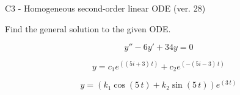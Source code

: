 \begin{exercise}
  \begin{exerciseTitle}C3 - Homogeneous second-order linear ODE (ver. 28)\end{exerciseTitle}
  \begin{exerciseStatement}
    
Find the general solution to the given ODE.

    
\[y''-6y'+34y = 0\]

  \end{exerciseStatement}
  \begin{exerciseAnswer}
    
\[y= c_{1} e^{\left(\left(5 i + 3\right) \, t\right)} + c_{2} e^{\left(-\left(5 i - 3\right) \, t\right)}\]

    
\[y= {\left(k_{1} \cos\left(5 \, t\right) + k_{2} \sin\left(5 \, t\right)\right)} e^{\left(3 \, t\right)}\]

  \end{exerciseAnswer}
\end{exercise}